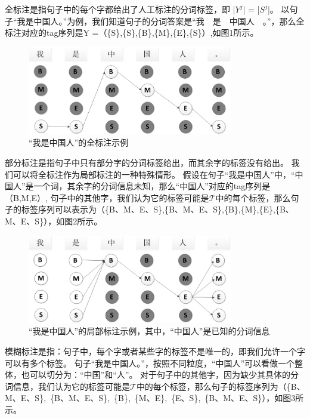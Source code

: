 \documentclass[a4paper, 11pt]{article}
\begin{document}
全标注是指句子中的每个字都给出了人工标注的分词标签，即 |$Y^j$| = |$S^j$|。
以句子“我是中国人。”为例，我们知道句子的分词答案是“我~~是~~中国人~~。”，那么全标注对应的tag序列是Y =（\{S\},\{S\},\{B\},\{M\},\{E\},\{S\}）,如图1所示。 %
\begin{figure}[htbp]
  \centering
    \includegraphics[width=0.8\textwidth]{full_anno_pic.png}
  \caption{“我是中国人”的全标注示例}\label{fig:digit}
\end{figure}


部分标注是指句子中只有部分字的分词标签给出，而其余字的标签没有给出。
我们可以将全标注作为局部标注的一种特殊情形。
假设在句子“我是中国人”中，“中国人”是一个词，其余字的分词信息未知，那么“中国人”对应的tag序列是（B,M,E）,
句子中的其他字，我们认为它的标签可能是$\mathcal{T}$中的每个标签，那么句子的标签序列可以表示为（\{B、M、E、S\},\{B、M、E、S\},\{B\},\{M\},\{E\},\{B、M、E、S\}），如图2所示。

\begin{figure}[!htbp]
  \centering
    \includegraphics[width=0.8\textwidth]{partial_anno.png}
  \caption{“我是中国人”的局部标注示例，其中，“中国人”是已知的分词信息}\label{fig:digit}
\end{figure}


模糊标注是指：句子中，每个字或者某些字的标签不是唯一的，即我们允许一个字可以有多个标签。
句子“我是中国人。”，按照不同粒度，“中国人”可以看做一个整体，也可以切分为：“中国”和“人”。
对于句子中的其他字，因为缺少其具体的分词信息，我们认为它的标签可能是$\mathcal{T}$中的每个标签，那么句子的标签序列为（\{B、M、E、S\},~\{B、M、E、S\},~\{B\},~\{M、E\},~\{E、S\},~\{B、M、E、S\}），如图3所示。
\end{document}
